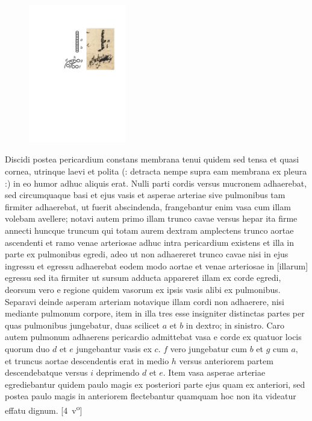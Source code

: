\begin{figure}                    
\includegraphics[trim = 0mm -3mm -5mm 0mm, clip,width=0.38\textwidth]{images/lh0040104b_004r2.pdf}\\
\end{figure}%
Discidi postea pericardium constans membrana tenui quidem sed tensa et quasi cornea, utrinque laevi et polita (: detracta nempe supra eam membrana ex pleura :) in eo humor adhuc aliquis erat. Nulli parti cordis versus mucronem adhaerebat, sed circumquaque basi et ejus vasis et asperae arteriae sive pulmonibus tam firmiter adhaerebat, ut fuerit abscindenda, frangebantur enim vasa cum illam volebam avellere; notavi autem primo illam trunco cavae versus hepar ita firme annecti huncque truncum qui totam aurem dextram amplectens trunco aortae ascendenti et ramo venae arteriosae adhuc intra pericardium existens
et illa in parte ex pulmonibus egredi, adeo ut non adhaereret trunco cavae nisi in ejus ingressu et egressu adhaerebat eodem modo aortae et venae arteriosae
in [illarum]
egressu sed ita firmiter ut sursum adducta appareret illam ex corde egredi, deorsum vero e regione quidem vasorum ex ipsis vasis alibi ex pulmonibus. Separavi deinde asperam arteriam notavique illam cordi non adhaerere, nisi mediante pulmonum corpore, item in illa tres esse insigniter distinctas partes per quas pulmonibus jungebatur, duas scilicet $a$ et $b$ in dextro;
in sinistro. Caro autem pulmonum adhaerens pericardio admittebat vasa e corde ex quatuor locis quorum duo $d$ et $e$ jungebantur vasis ex $c.$
$f$ vero jungebatur cum $b$ et $g$ cum $a,$
et truncus aortae descendentis erat in medio $h$ versus anteriorem partem descendebatque versus $i$ deprimendo $d$ et $e.$
Item vasa asperae arteriae egrediebantur quidem paulo magis ex posteriori parte ejus quam ex anteriori, sed postea paulo magis in anteriorem flectebantur quamquam hoc non ita videatur effatu dignum.
[4~v\textsuperscript{o}]
\pend
